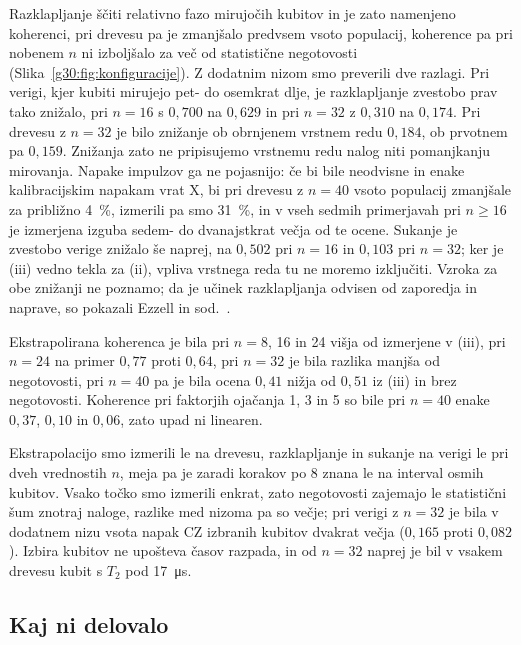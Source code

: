  Razklapljanje ščiti relativno fazo mirujočih kubitov in je zato namenjeno koherenci, pri drevesu pa je zmanjšalo predvsem vsoto populacij, koherence pa pri nobenem $n$ ni izboljšalo za več od statistične negotovosti (Slika~\ref{g30:fig:konfiguracije}). Z dodatnim nizom smo preverili dve razlagi. Pri verigi, kjer kubiti mirujejo pet- do osemkrat dlje, je razklapljanje zvestobo prav tako znižalo, pri $n = 16$ s $0{,}700$ na $0{,}629$ in pri $n = 32$ z $0{,}310$ na $0{,}174$. Pri drevesu z $n = 32$ je bilo znižanje ob obrnjenem vrstnem redu $0{,}184$, ob prvotnem pa $0{,}159$. Znižanja zato ne pripisujemo vrstnemu redu nalog niti pomanjkanju mirovanja. Napake impulzov ga ne pojasnijo: če bi bile neodvisne in enake kalibracijskim napakam vrat X, bi pri drevesu z $n = 40$ vsoto populacij zmanjšale za približno \SI{4}{\percent}, izmerili pa smo \SI{31}{\percent}, in v vseh sedmih primerjavah pri $n \geq 16$ je izmerjena izguba sedem- do dvanajstkrat večja od te ocene. Sukanje je zvestobo verige znižalo še naprej, na $0{,}502$ pri $n = 16$ in $0{,}103$ pri $n = 32$; ker je (iii) vedno tekla za (ii), vpliva vrstnega reda tu ne moremo izključiti. Vzroka za obe znižanji ne poznamo; da je učinek razklapljanja odvisen od zaporedja in naprave, so pokazali Ezzell in sod.~\cite{g30:ezzell2023}.

 Ekstrapolirana koherenca je bila pri $n = 8$, 16 in 24 višja od izmerjene v (iii), pri $n = 24$ na primer $0{,}77$ proti $0{,}64$, pri $n = 32$ je bila razlika manjša od negotovosti, pri $n = 40$ pa je bila ocena $0{,}41$ nižja od $0{,}51$ iz (iii) in brez negotovosti. Koherence pri faktorjih ojačanja 1, 3 in 5 so bile pri $n = 40$ enake $0{,}37$, $0{,}10$ in $0{,}06$, zato upad ni linearen.

 Ekstrapolacijo smo izmerili le na drevesu, razklapljanje in sukanje na verigi le pri dveh vrednostih $n$, meja pa je zaradi korakov po 8 znana le na interval osmih kubitov. Vsako točko smo izmerili enkrat, zato negotovosti zajemajo le statistični šum znotraj naloge, razlike med nizoma pa so večje; pri verigi z $n = 32$ je bila v dodatnem nizu vsota napak CZ izbranih kubitov dvakrat večja ($0{,}165$ proti $0{,}082$). Izbira kubitov ne upošteva časov razpada, in od $n = 32$ naprej je bil v vsakem drevesu kubit s $T_2$ pod \SI{17}{\micro\second}.

\subsection{Kaj ni delovalo}
\label{g30:sec:neuspehi}

